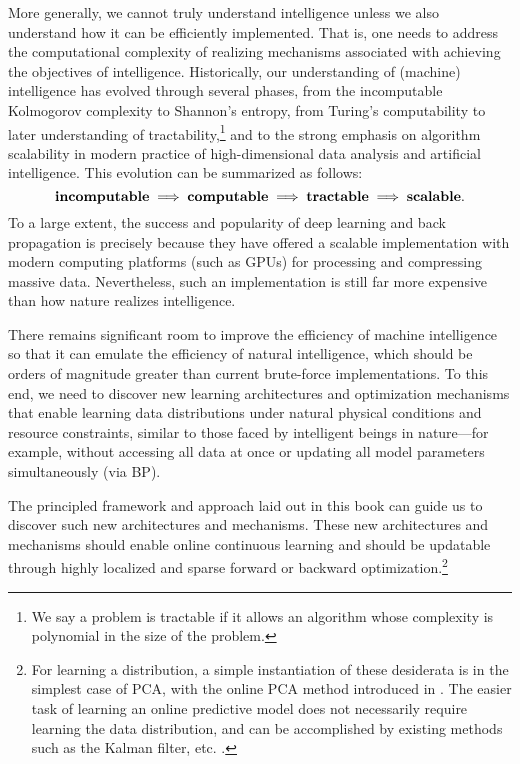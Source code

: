 \documentclass[../../book-main.tex]{subfiles}
\begin{document}
More generally, we cannot truly understand intelligence unless we also understand how it can be efficiently implemented. That is, one needs to address the computational complexity of realizing mechanisms associated with achieving the objectives of intelligence. Historically, our understanding of (machine) intelligence has evolved through several phases, from the incomputable Kolmogorov complexity to Shannon's entropy, from Turing's computability to later understanding of tractability,\footnote{We say a problem is tractable if it allows an algorithm whose complexity is polynomial in the size of the problem.} and to the strong emphasis on algorithm scalability in modern practice of high-dimensional data analysis \cite{Wright-Ma-2022} and artificial intelligence. This evolution can be summarized as follows:
\begin{equation}
   \text{\textbf{incomputable}} \;
   \Longrightarrow \; \text{\textbf{computable}} \;
   \Longrightarrow \; \text{\textbf{tractable}} \; \Longrightarrow \; 
   \text{\textbf{scalable}}.
\end{equation}
To a large extent, the success and popularity of deep learning and back propagation is precisely because they have offered a scalable implementation with modern computing platforms (such as GPUs) for processing and compressing massive data. Nevertheless, such an implementation is still far more expensive than how nature realizes intelligence.

There remains significant room to improve the efficiency of machine intelligence so that it can emulate the efficiency of natural intelligence, which should be orders of magnitude greater than current brute-force implementations. To this end, we need to discover new learning architectures and optimization mechanisms that enable learning data distributions under natural physical conditions and resource constraints, similar to those faced by intelligent beings in nature---for example, without accessing all data at once or updating all model parameters simultaneously (via BP).

The principled framework and approach laid out in this book can guide us to discover such new architectures and mechanisms. These new architectures and mechanisms should enable online continuous learning and should be updatable through highly localized and sparse forward or backward optimization.\footnote{For learning a distribution, a simple instantiation of these desiderata is in the simplest case of PCA, with the online PCA method introduced in . The easier task of learning an online predictive model does not necessarily require learning the data distribution, and can be accomplished by existing methods such as the Kalman filter, etc. \cite{peng2025mathematics}.}
\end{document}
